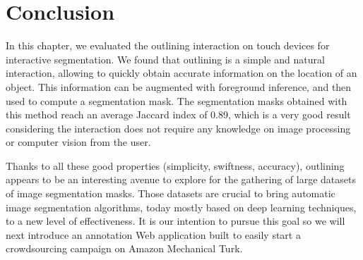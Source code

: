 \section{Conclusion}


In this chapter, we evaluated the outlining interaction
on touch devices for interactive segmentation.
We found that outlining is a simple and natural interaction, allowing
to quickly obtain accurate information on the location of an object.
This information can be augmented with foreground inference,
and then used to compute a segmentation mask.
The segmentation masks obtained with this method reach an average
Jaccard index of 0.89, which is a very good result
considering the interaction does not require any knowledge
on image processing or computer vision from the user.


Thanks to all these good properties (simplicity, swiftness, accuracy),
outlining appears to be an interesting avenue to explore for the gathering
of large datasets of image segmentation masks.
Those datasets are crucial to bring automatic image segmentation algorithms,
today mostly based on deep learning techniques, to a new level of effectiveness.
It is our intention to pursue this goal so
we will next introduce an annotation Web application
built to easily start a crowdsourcing campaign on Amazon Mechanical Turk.
